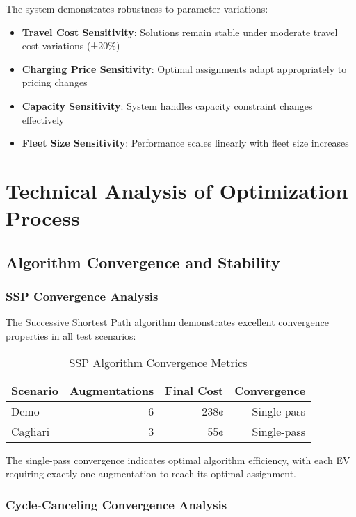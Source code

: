 \documentclass[12pt,a4paper]{article}
\begin{document}
The system demonstrates robustness to parameter variations:

\begin{itemize}
\item \textbf{Travel Cost Sensitivity}: Solutions remain stable under moderate travel cost variations (±20\%)
\item \textbf{Charging Price Sensitivity}: Optimal assignments adapt appropriately to pricing changes
\item \textbf{Capacity Sensitivity}: System handles capacity constraint changes effectively
\item \textbf{Fleet Size Sensitivity}: Performance scales linearly with fleet size increases
\end{itemize}

\section{Technical Analysis of Optimization Process}

\subsection{Algorithm Convergence and Stability}

\subsubsection{SSP Convergence Analysis}

The Successive Shortest Path algorithm demonstrates excellent convergence properties in all test scenarios:

\begin{table}[H]
\centering
\caption{SSP Algorithm Convergence Metrics}
\label{tab:ssp_convergence}
\begin{tabular}{@{}lrrr@{}}
\toprule
\textbf{Scenario} & \textbf{Augmentations} & \textbf{Final Cost} & \textbf{Convergence} \\
\midrule
Demo & 6 & 238¢ & Single-pass \\
Cagliari & 3 & 55¢ & Single-pass \\
\bottomrule
\end{tabular}
\end{table}

The single-pass convergence indicates optimal algorithm efficiency, with each EV requiring exactly one augmentation to reach its optimal assignment.

\subsubsection{Cycle-Canceling Convergence Analysis}
\end{document}
